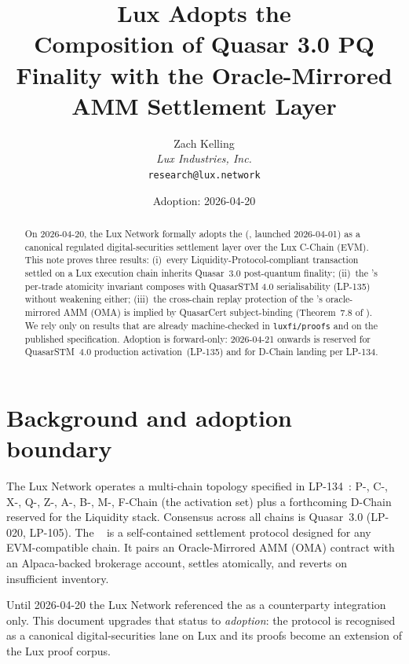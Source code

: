 \documentclass[11pt]{article}
\title{Lux Adopts the \\
{\large Composition of Quasar 3.0 PQ Finality with the Oracle-Mirrored
AMM Settlement Layer}}
\author{Zach Kelling\\
\textit{Lux Industries, Inc.}\\
\texttt{research@lux.network}}
\date{Adoption: 2026-04-20}
\begin{document}
\maketitle

\begin{abstract}
On 2026-04-20, the Lux Network formally adopts the
\emph{} (, launched 2026-04-01) as a
canonical regulated digital-securities settlement layer over the Lux
C-Chain (EVM). This note proves three results: (i)~every
Liquidity-Protocol-compliant transaction settled on a Lux execution
chain inherits Quasar~3.0 post-quantum finality;
(ii)~the 's per-trade atomicity invariant composes
with QuasarSTM 4.0 serialisability (LP-135) without weakening either;
(iii)~the cross-chain replay protection of the 's
oracle-mirrored AMM (OMA) is implied by QuasarCert subject-binding
(Theorem~7.8 of \cite{quasar-cert}).  We rely only on results that are
already machine-checked in \texttt{luxfi/proofs} and on the published
 specification.  Adoption is forward-only:
2026-04-21 onwards is reserved for QuasarSTM~4.0 production
activation~(LP-135) and for D-Chain landing per LP-134.
\end{abstract}

\tableofcontents

\section{Background and adoption boundary}
\label{sec:background}

The Lux Network operates a multi-chain topology specified in
LP-134~\cite{lp134}: P-, C-, X-, Q-, Z-, A-, B-, M-, F-Chain
(the activation set) plus a forthcoming D-Chain reserved for the
Liquidity stack. Consensus across all chains is Quasar~3.0
(LP-020, LP-105). The ~\cite{lp-paper} is a
self-contained settlement protocol designed for any EVM-compatible
chain. It pairs an Oracle-Mirrored AMM (OMA) contract with an
Alpaca-backed  brokerage account, settles atomically, and
reverts on insufficient inventory.

Until 2026-04-20 the Lux Network referenced the  as a
counterparty integration only.  This document upgrades that status to
\emph{adoption}: the protocol is recognised as a canonical
digital-securities lane on Lux and its proofs become an extension of
the Lux proof corpus.
\end{document}
